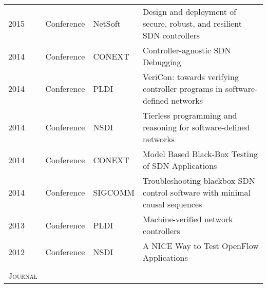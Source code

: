 \begin{appendices}
\begin{table}[ht!]
\begin{adjustbox}{width=\linewidth, center}
\begin{tabular}{llll}
2015          & Conference          & NetSoft                      & Design and deployment of secure, robust, and resilient SDN controllers\citep{7258233}                                                                                          \\
2014          & Conference          & CONEXT                       & Controller-agnostic SDN Debugging\citep{10.1145/2674005.2674993}                                                                                                               \\
2014          & Conference          & PLDI                         & VeriCon: towards verifying controller programs in software-defined networks\citep{10.1145/2666356.2594317}                                                                     \\
2014          & Conference          & NSDI                         & Tierless programming and reasoning for software-defined networks\citep{10.5555/2616448.2616496}                                                                                \\
2014          & Conference          & CONEXT                       & Model Based Black-Box Testing of SDN Applications\citep{10.1145/2680821.2680828}                                                                                               \\
2014          & Conference          & SIGCOMM                      & Troubleshooting blackbox SDN control software with minimal causal sequences\citep{10.1145/2740070.2626304}                                                                     \\
2013          & Conference          & PLDI                         & Machine-verified network controllers\citep{10.1145/2499370.2462178}                                                                                                            \\
2012          & Conference          & NSDI                         & A NICE Way to Test OpenFlow Applications\citep{180591}                                                                                                                         \\
              &                     &                              &                                                                                                                                                                                \\
\textsc{Journal} & & &\\ \hline

\end{tabular}
\end{adjustbox}
\end{table}
\end{appendices}
